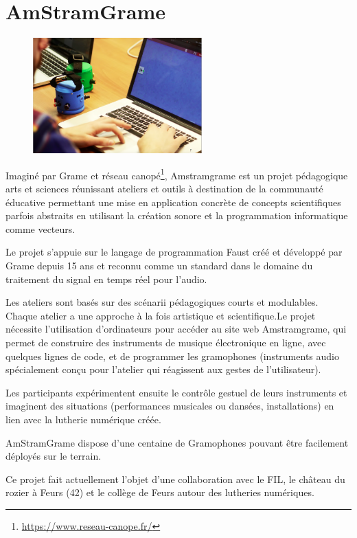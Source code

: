\documentclass[fontsize=12pt]{scrartcl} %
\numberwithin{equation}{section} %
\numberwithin{table}{section} %
\begin{document}
\pagebreak

\section{AmStramGrame}
\label{app:amstram}

\begin{figure}
\centering
\includegraphics[width=6.5cm]{img/amstram}
\label{fig:amstram}
\end{figure}

Imaginé par Grame et réseau canopé\footnote{\url{https://www.reseau-canope.fr/}}, Amstramgrame est un projet pédagogique arts et sciences réunissant ateliers et outils à destination de la communauté éducative permettant une mise en application concrète de concepts scientifiques parfois abstraits en utilisant la création sonore et la programmation informatique comme vecteurs.

Le projet s'appuie sur le langage de programmation Faust créé et développé par Grame depuis 15 ans et reconnu comme un standard dans le domaine du traitement du signal en temps réel pour l'audio. 

Les ateliers sont basés sur des scénarii pédagogiques courts et modulables. Chaque atelier a une approche à la fois artistique et scientifique.Le projet nécessite l'utilisation d'ordinateurs pour accéder au site web Amstramgrame, qui permet de construire des instruments de musique électronique en ligne, avec quelques lignes de code, et de programmer les gramophones (instruments audio spécialement conçu pour l'atelier qui réagissent aux gestes de l'utilisateur).
 
Les participants expérimentent ensuite le contrôle gestuel de leurs instruments et imaginent des situations (performances musicales ou dansées, installations) en lien avec la lutherie numérique créée.

AmStramGrame dispose d'une centaine de Gramophones pouvant être facilement déployés sur le terrain.

Ce projet fait actuellement l'objet d'une collaboration avec le FIL, le château du rozier à Feurs (42) et le collège de Feurs autour des lutheries numériques.\\
\end{document}
